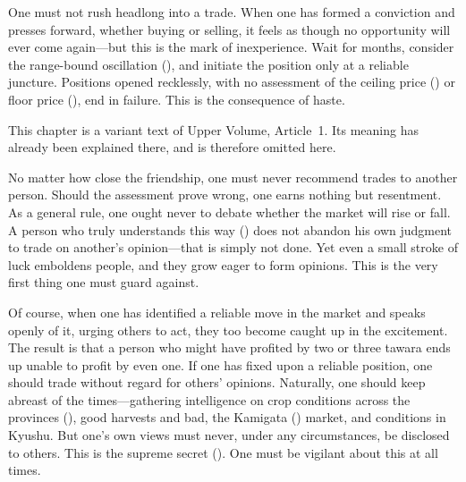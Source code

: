 
\begin{sokyubox}
{\small\itshape\color{sokyubar} }

\medskip
One must not rush headlong into a trade. When one has formed a conviction
and presses forward, whether buying or selling, it feels as though no
opportunity will ever come again---but this is the mark of inexperience.
Wait for months, consider the range-bound oscillation (),
and initiate the position only at a reliable juncture. Positions opened
recklessly, with no assessment of the ceiling price () or floor price (), end in failure. This is
the consequence of haste.
\end{sokyubox}

\commentary
This chapter is a variant text of Upper Volume, Article~1. Its meaning has
already been explained there, and is therefore omitted here.


\begin{sokyubox}
{\small\itshape\color{sokyubar} }

\medskip
No matter how close the friendship, one must never recommend trades to
another person. Should the assessment prove wrong, one earns nothing but
resentment. As a general rule, one ought never to debate whether the market
will rise or fall. A person who truly understands this way () does not abandon his own judgment to trade on another's
opinion---that is simply not done. Yet even a small stroke of luck
emboldens people, and they grow eager to form opinions. This is the very
first thing one must guard against.

Of course, when one has identified a reliable move in the market and speaks
openly of it, urging others to act, they too become caught up in the
excitement. The result is that a person who might have profited by two or
three tawara ends up unable to profit by even one. If one has fixed upon a
reliable position, one should trade without regard for others' opinions.
Naturally, one should keep abreast of the times---gathering intelligence on
crop conditions across the provinces (), good
harvests and bad, the Kamigata () market, and
conditions in Kyushu. But one's own views must never, under any
circumstances, be disclosed to others. This is the supreme secret
(). One must be vigilant about this at all times.
\end{sokyubox}

